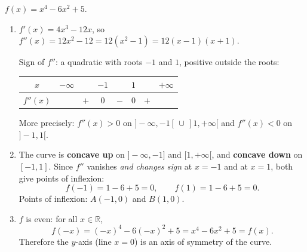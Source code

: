 \documentclass[11pt]{article}
\newcommand{\cle}[1]{{\popxbold\color{popdark}#1}}
\begin{document}
\begin{corrige}
$f(x)=x^{4}-6x^{2}+5$.

\begin{enumerate}
\item $f'(x)=4x^{3}-12x$, so $f''(x)=12x^{2}-12=12(x^{2}-1)=12(x-1)(x+1)$.

Sign of $f''$: a quadratic with roots $-1$ and $1$, positive outside the roots:
\begin{center}
\begin{tabular}{|c|ccccccc|}
\hline
$x$ & $-\infty$ & & $-1$ & & $1$ & & $+\infty$ \\
\hline
$f''(x)$ & & $+$ & $0$ & $-$ & $0$ & $+$ & \\
\hline
\end{tabular}
\end{center}
More precisely: $f''(x)>0$ on $]-\infty,-1[\,\cup\,]1,+\infty[$ and $f''(x)<0$ on $]-1,1[$.

\item The curve is \textbf{concave up} on $]-\infty,-1]$ and $[1,+\infty[$, and \textbf{concave down} on $[-1,1]$. Since $f''$ vanishes \emph{and changes sign} at $x=-1$ and at $x=1$, both give points of inflexion:
\[ f(-1)=1-6+5=0, \qquad f(1)=1-6+5=0. \]
Points of inflexion: $A(-1,0)$ and $B(1,0)$.

\item $f$ is even: for all $x\in\mathbb{R}$,
\[ f(-x)=(-x)^{4}-6(-x)^{2}+5=x^{4}-6x^{2}+5=f(x). \]
Therefore the $y$-axis (line $x=0$) is an \cle{axis of symmetry} of the curve.
\end{enumerate}
\end{corrige}
\end{document}

